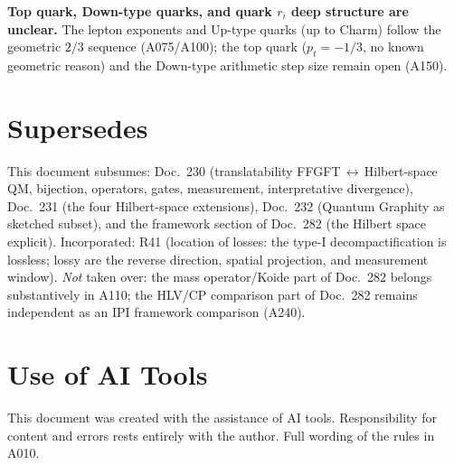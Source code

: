 \textbf{Top quark, Down-type quarks, and quark $r_i$ deep structure are unclear.}
The lepton exponents and Up-type quarks (up to Charm) follow the geometric $2/3$
sequence (A075/A100); the top quark ($p_t=-1/3$, no known geometric reason) and
the Down-type arithmetic step size remain open (A150).

\section{Supersedes}

This document subsumes: Doc.~230 (translatability FFGFT$\,\leftrightarrow\,$Hilbert-space
QM, bijection, operators, gates, measurement, interpretative divergence), Doc.~231
(the four Hilbert-space extensions), Doc.~232 (Quantum Graphity as sketched subset),
and the framework section of Doc.~282 (the Hilbert space explicit). Incorporated:
R41 (location of losses: the type-I decompactification is lossless; lossy are
the reverse direction, spatial projection, and measurement window). \emph{Not}
taken over: the mass operator/Koide part of Doc.~282 belongs substantively in
A110; the HLV/CP comparison part of Doc.~282 remains independent as an IPI
framework comparison (A240).

\section{Use of AI Tools}

This document was created with the assistance of AI tools.
Responsibility for content and errors rests entirely with the author.
Full wording of the rules in A010.
